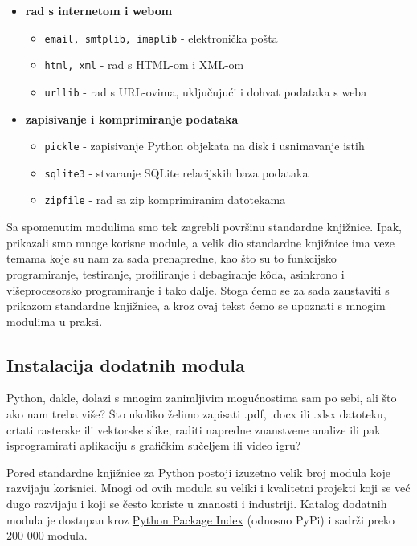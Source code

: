 \begin{itemize}
    \item \textbf{rad s internetom i webom}
    \begin{itemize}
        \item \texttt{email, smtplib, imaplib} - elektronička pošta
        \item \texttt{html, xml} - rad s HTML-om i XML-om
        \item \texttt{urllib} - rad s URL-ovima, uključujući i dohvat podataka s weba
    \end{itemize}

    \item \textbf{zapisivanje i komprimiranje podataka}
    \begin{itemize}
        \item \texttt{pickle} - zapisivanje Python objekata na disk i usnimavanje istih
        \item \texttt{sqlite3} - stvaranje SQLite relacijskih baza podataka
        \item \texttt{zipfile} - rad sa zip komprimiranim datotekama
    \end{itemize}

\end{itemize}


Sa spomenutim modulima smo tek zagrebli površinu standardne knjižnice. Ipak, prikazali smo mnoge korisne module, a velik dio standardne knjižnice ima veze temama koje su nam za sada prenapredne, kao što su to funkcijsko programiranje, testiranje, profiliranje i debagiranje kôda, asinkrono i višeprocesorsko programiranje i tako dalje. Stoga ćemo se za sada zaustaviti s prikazom standardne knjižnice, a kroz ovaj tekst ćemo se upoznati s mnogim modulima u praksi.



\subsection{Instalacija dodatnih modula}

Python, dakle, dolazi s mnogim zanimljivim mogućnostima sam po sebi, ali što ako nam treba više? Što ukoliko želimo zapisati .pdf, .docx ili .xlsx datoteku, crtati rasterske ili vektorske slike, raditi napredne znanstvene analize ili pak isprogramirati aplikaciju s grafičkim sučeljem ili video igru?

Pored standardne knjižnice za Python postoji izuzetno velik broj modula koje razvijaju korisnici. Mnogi od ovih modula su veliki i kvalitetni projekti koji se već dugo razvijaju i koji se često koriste u znanosti i industriji. Katalog dodatnih modula je dostupan kroz \href{https://pypi.org/}{Python Package Index} (odnosno PyPi) i sadrži preko 200 000 modula.

